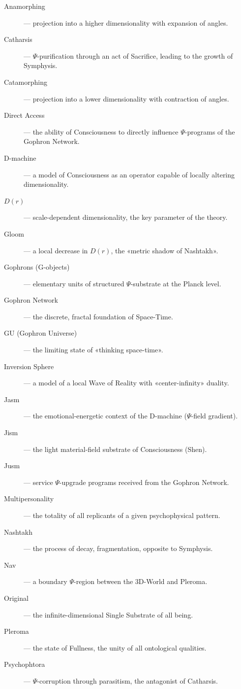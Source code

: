 \documentclass[a4paper,12pt]{article}
\begin{document}
	\begin{description}
		\item[Anamorphing] — projection into a higher dimensionality with expansion of angles.
		\item[Catharsis] — $\Psi$-purification through an act of Sacrifice, leading to the growth of Symphysis.
		\item[Catamorphing] — projection into a lower dimensionality with contraction of angles.
		\item[Direct Access] — the ability of Consciousness to directly influence $\Psi$-programs of the Gophron Network.
		\item[D-machine] — a model of Consciousness as an operator capable of locally altering dimensionality.
		\item[$D(r)$] — scale-dependent dimensionality, the key parameter of the theory.
		\item[Gloom] — a local decrease in $D(r)$, the «metric shadow of Nashtakh».
		\item[Gophrons (G-objects)] — elementary units of structured $\Psi$-substrate at the Planck level.
		\item[Gophron Network] — the discrete, fractal foundation of Space-Time.
		\item[GU (Gophron Universe)] — the limiting state of «thinking space-time».
		\item[Inversion Sphere] — a model of a local Wave of Reality with «center-infinity» duality.
		\item[Jasm] — the emotional-energetic context of the D-machine ($\Psi$-field gradient).
		\item[Jism] — the light material-field substrate of Consciousness (Shen).
		\item[Jusm] — service $\Psi$-upgrade programs received from the Gophron Network.
		\item[Multipersonality] — the totality of all replicants of a given psychophysical pattern.
		\item[Nashtakh] — the process of decay, fragmentation, opposite to Symphysis.
		\item[Nav] — a boundary $\Psi$-region between the 3D-World and Pleroma.
		\item[Original] — the infinite-dimensional Single Substrate of all being.
		\item[Pleroma] — the state of Fullness, the unity of all ontological qualities.
		\item[Psychophtora] — $\Psi$-corruption through parasitism, the antagonist of Catharsis.

\end{description}
\end{document}
